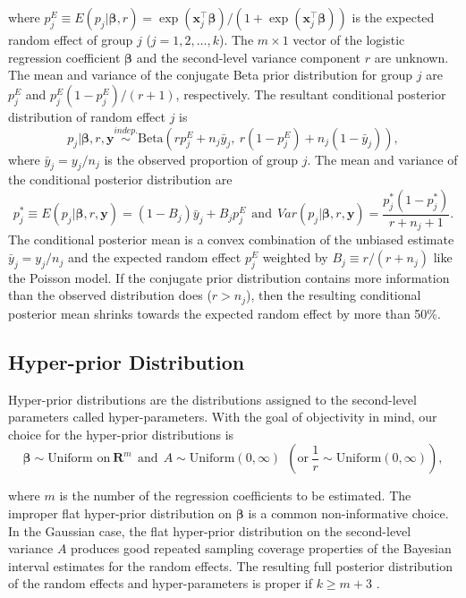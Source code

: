 \documentclass[article]{jss}
\begin{document}
where $p^E_j\equiv E(p_j\vert \boldsymbol{\beta}, r)=\exp(\boldsymbol{x}_j^\top\boldsymbol{\beta})/(1+\exp(\boldsymbol{x}_j^\top\boldsymbol{\beta}))$ is the expected random effect  of group $j$ ($j=1, 2, \ldots, k$). The $m\times 1$ vector of the logistic regression coefficient $\boldsymbol{\beta}$ and the second-level variance component $r$ are unknown. The mean and variance of the conjugate Beta prior distribution for group $j$ are $p^E_j$ and $p^E_j(1-p^E_j)/(r+1)$, respectively.  The resultant conditional posterior distribution of random effect $j$  is
\begin{equation} \label{betapost}
p_{j}\vert  \boldsymbol{\beta}, r, \boldsymbol{y} \stackrel{indep.}{\sim}\textrm{Beta}(rp^E_j+n_{j}\bar{y}_{j},~r(1-p^E_j)+n_{j}(1-\bar{y}_{j})),
\end{equation}
where $\bar{y}_j=y_j/n_j$ is the observed proportion of group $j$. The mean and variance of the conditional posterior distribution are
\begin{equation}\label{betapost_mean_var}
p_j^\ast\equiv E(p_j\vert \boldsymbol{\beta}, r, \boldsymbol{y} )=(1-B_{j})\bar{y}_{j} + B_{j}p^E_j~~\textrm{and}~~Var(p_j\vert  \boldsymbol{\beta}, r,  \boldsymbol{y})=\frac{p_j^\ast(1-p_j^\ast)}{r+n_j+1}.
\end{equation}
The conditional posterior mean is  a convex combination of the unbiased estimate $\bar{y}_{j} = y_j/n_j$ and the expected random effect  $p^E_j$ weighted by $B_j\equiv r / (r + n_j)$ like the Poisson model.  If the conjugate prior distribution contains more information than the observed distribution does ($r>n_j$), then the resulting conditional posterior mean shrinks towards the expected random effect by more than 50\%.


\subsection[Hyper-prior distributions]{Hyper-prior Distribution}
Hyper-prior distributions are the distributions assigned to the second-level parameters called hyper-parameters. With the goal of objectivity in mind, our choice for the hyper-prior distributions is
\begin{equation}\label{eq:hyper}
\boldsymbol{\beta} \sim \textrm{Uniform on}~ \textbf{R}^{m}~~\textrm{and}~~A \sim \textrm{Uniform}(0, \infty) ~~(\textrm{or} ~\frac{1}{r}\sim \textrm{Uniform}(0, \infty)),
\end{equation}

where $m$ is the number of the regression coefficients to be estimated. The improper flat hyper-prior distribution on $\boldsymbol{\beta}$ is a common non-informative choice.  In the Gaussian case, the flat hyper-prior distribution on the second-level variance $A$ produces good repeated sampling coverage properties of the Bayesian interval estimates for the random effects. The resulting full posterior distribution of the random effects and hyper-parameters is proper if $k\ge m+3$ \citep{tang2011, kelly2014advances}. 
\end{document}
